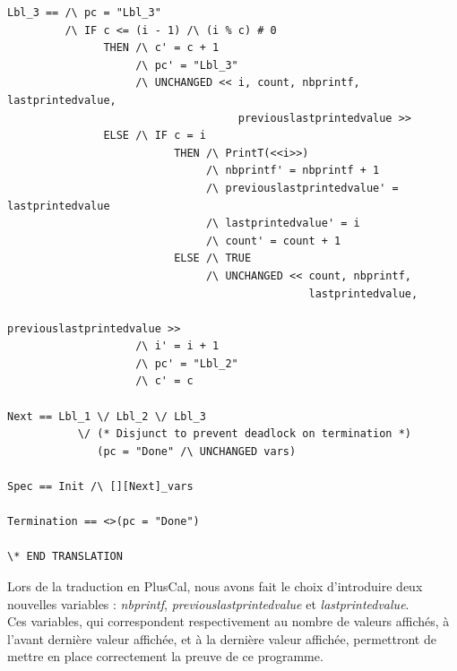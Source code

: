 \documentclass{scrreprt}
\begin{document}
\begin{lstlisting}
Lbl_3 == /\ pc = "Lbl_3"
         /\ IF c <= (i - 1) /\ (i % c) # 0
               THEN /\ c' = c + 1
                    /\ pc' = "Lbl_3"
                    /\ UNCHANGED << i, count, nbprintf, lastprintedvalue,
                                    previouslastprintedvalue >>
               ELSE /\ IF c = i
                          THEN /\ PrintT(<<i>>)
                               /\ nbprintf' = nbprintf + 1
                               /\ previouslastprintedvalue' = lastprintedvalue
                               /\ lastprintedvalue' = i
                               /\ count' = count + 1
                          ELSE /\ TRUE
                               /\ UNCHANGED << count, nbprintf,
                                               lastprintedvalue,
                                               previouslastprintedvalue >>
                    /\ i' = i + 1
                    /\ pc' = "Lbl_2"
                    /\ c' = c

Next == Lbl_1 \/ Lbl_2 \/ Lbl_3
           \/ (* Disjunct to prevent deadlock on termination *)
              (pc = "Done" /\ UNCHANGED vars)

Spec == Init /\ [][Next]_vars

Termination == <>(pc = "Done")

\* END TRANSLATION
\end{lstlisting}

Lors de la traduction en PlusCal, nous avons fait le choix d'introduire deux nouvelles variables : \emph{nbprintf}, \emph{previouslastprintedvalue} et \emph{lastprintedvalue}.
\\
Ces variables, qui correspondent respectivement au nombre de valeurs affichés, à l'avant dernière valeur affichée, et à la dernière valeur affichée, permettront de mettre en place correctement la preuve de ce programme.
\end{document}
